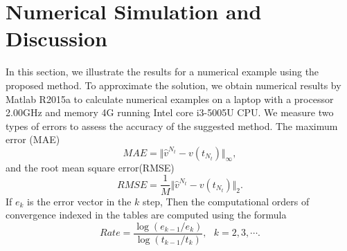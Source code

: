 \documentclass[9pt]{article}
\numberwithin{equation}{section}
\begin{document}
\section{Numerical Simulation and Discussion}\label{Sec4}
In this section, we illustrate the results for a numerical example using the proposed method. To approximate the solution, we obtain numerical results by Matlab R2015a to calculate numerical examples on a laptop with a processor 2.00GHz and memory 4G running Intel core i3-5005U CPU. We measure two types of errors to assess the accuracy of the suggested method. The maximum error (MAE)
\begin{equation*}
MAE=\Vert \widehat{v}^{N_t}-v(t_{N_t})\Vert_{\infty},
\end{equation*}
and the root mean square error(RMSE)
\begin{equation*}
RMSE=\frac{1}{M}\Vert \widehat{v}^{N_t}-v(t_{N_t})\Vert_{2}.
\end{equation*}
 If $e_{k}$ is the error vector in the $k$ step, Then the computational orders of convergence indexed in the tables are computed using the formula
\begin{equation*}
Rate=\frac{\log(e_{k-1}/e_{k})}{\log(t_{k-1}/t_{k})}, ~~~k=2,3,\cdots.
\end{equation*}
\end{document}

